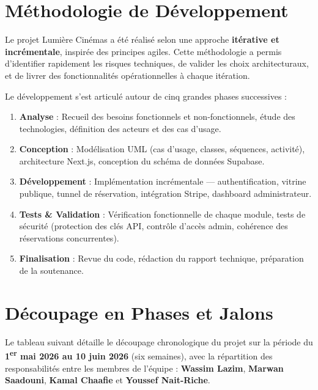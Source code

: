 \documentclass[12pt,a4paper,openany]{report}
\begin{document}
\section{Méthodologie de Développement}

Le projet Lumière Cinémas a été réalisé selon une approche \textbf{itérative et incrémentale}, inspirée des principes agiles. Cette méthodologie a permis d'identifier rapidement les risques techniques, de valider les choix architecturaux, et de livrer des fonctionnalités opérationnelles à chaque itération.

Le développement s'est articulé autour de cinq grandes phases successives :

\begin{enumerate}[leftmargin=2em]
  \item \textbf{Analyse} : Recueil des besoins fonctionnels et non-fonctionnels, étude des technologies, définition des acteurs et des cas d'usage.
  \item \textbf{Conception} : Modélisation UML (cas d'usage, classes, séquences, activité), architecture Next.js, conception du schéma de données Supabase.
  \item \textbf{Développement} : Implémentation incrémentale — authentification, vitrine publique, tunnel de réservation, intégration Stripe, dashboard administrateur.
  \item \textbf{Tests \& Validation} : Vérification fonctionnelle de chaque module, tests de sécurité (protection des clés API, contrôle d'accès admin, cohérence des réservations concurrentes).
  \item \textbf{Finalisation} : Revue du code, rédaction du rapport technique, préparation de la soutenance.
\end{enumerate}

\section{Découpage en Phases et Jalons}

Le tableau suivant détaille le découpage chronologique du projet sur la période du \textbf{1\textsuperscript{er} mai 2026 au 10 juin 2026} (six semaines), avec la répartition des responsabilités entre les membres de l'équipe : \textbf{Wassim Lazim}, \textbf{Marwan Saadouni}, \textbf{Kamal Chaafie} et \textbf{Youssef Nait-Riche}.
\end{document}
